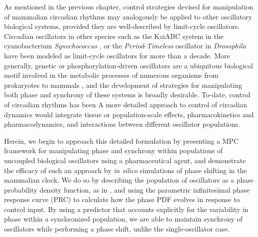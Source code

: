 As mentioned in the previous chapter, control strategies devised for manipulation of mammalian circadian rhythms may analogously be applied to other oscillatory biological systems, provided they are well-described by limit-cycle oscillators.
Circadian oscillators in other species such as the KaiABC system in the cyanobacterium \textit{Synechococcus} \cite{Ishiura1998}, or the \textit{Period}-\textit{Timeless} oscillator in \textit{Drosophila} \cite{Glossop1999} have been modeled as limit-cycle oscillators for more than a decade.
More generally, genetic or phosphorylation-driven oscillators are a ubiquitous biological motif involved in the metabolic processes of numerous organisms from prokaryotes to mammals \cite{Huang2003, Goodwin1965}, and the development of strategies for manipulating both phase and synchrony of these systems is broadly desirable.
To-date, control of circadian rhythms has been 
A more detailed approach to control of circadian dynamics would integrate tissue or population-scale effects, pharmacokinetics and pharmacodynamics, and interactions between different oscillator populations.

Herein, we begin to approach this detailed formulation by presenting a MPC framework for manipulating phase and synchrony within populations of uncoupled biological oscillators using a pharmaceutical agent, and demonstrate the efficacy of such an approach by \textit{in silico} simulations of phase shifting in the mammalian clock.
We do so by describing the population of oscillators as a phase probability density function, as in \cite{StJohn2014b}, and using the parametric infinitesimal phase response curve (PRC) to calculate how the phase PDF evolves in response to control input.
By using a predictor that accounts explicitly for the variability in phase within a synchronized population, we are able to maintain synchrony of oscillators while performing a phase shift, unlike the single-oscillator case.


